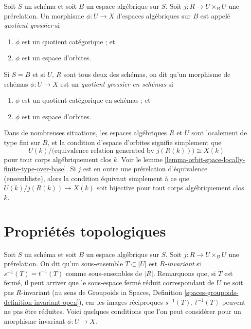 \begin{definition}
\label{definition-coarse}
Soit $S$ un schéma et soit $B$ un espace algébrique sur $S$.
Soit $j : R \to U \times_B U$ une prérelation.
Un morphisme $\phi : U \to X$ d'espaces algébriques sur $B$
est appelé {\it quotient grossier} si
\begin{enumerate}
\item $\phi$ est un quotient catégorique ; et
\item $\phi$ est un espace d'orbites.
\end{enumerate}
Si $S = B$ et si $U$, $R$ sont tous deux des schémas, on dit qu'un morphisme de schémas
$\phi : U \to X$ est un {\it quotient grossier en schémas} si
\begin{enumerate}
\item $\phi$ est un quotient catégorique en schémas ; et
\item $\phi$ est un espace d'orbites.
\end{enumerate}
\end{definition}

\noindent
Dans de nombreuses situations, les espaces algébriques $R$ et $U$ sont localement de type fini
sur $B$, et la condition d'espace d'orbites signifie simplement que
$$
U(k)/\big(\text{equivalence relation generated by }j(R(k))\big)
\cong
X(k)
$$
pour tout corps algébriquement clos $k$. Voir le
lemme \ref{lemma-orbit-space-locally-finite-type-over-base}.
Si $j$ est en outre une prérelation d'équivalence (ensembliste), alors la condition
équivaut simplement à ce que $U(k)/j(R(k)) \to X(k)$ soit bijective pour tout
corps algébriquement clos $k$.









\section{Propriétés topologiques}
\label{section-topological}

\noindent
Soit $S$ un schéma et soit $B$ un espace algébrique sur $S$.
Soit $j : R \to U \times_B U$ une prérelation.
On dit qu'un sous-ensemble $T \subset |U|$ est {\it $R$-invariant} si
$s^{-1}(T) = t^{-1}(T)$ comme sous-ensembles de $|R|$.
Remarquons que, si $T$ est fermé, il peut arriver que
le sous-espace fermé réduit correspondant de $U$ ne soit pas $R$-invariant
(au sens de
Groupoids in Spaces, Definition
\ref{spaces-groupoids-definition-invariant-open}),
car les images réciproques $s^{-1}(T)$, $t^{-1}(T)$ peuvent ne pas être réduites.
Voici quelques conditions que l'on peut considérer pour un
morphisme invariant $\phi : U \to X$.

